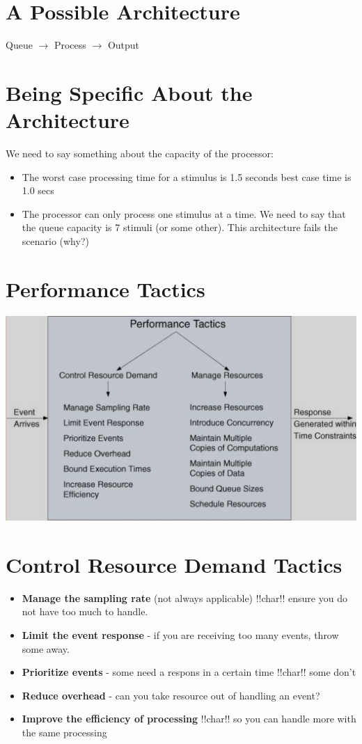 \documentclass[a4paper]{report}
\begin{document}
\section{A Possible Architecture}

Queue $\rightarrow$ Process $\rightarrow$ Output

\section{Being Specific About the Architecture}

We need to say something about the capacity of the processor:
\begin{itemize}
\item{The worst case processing time for a stimulus is 1.5 seconds best case time is 1.0 secs}
\item{The processor can only process one stimulus at a time.}
We need to say that the queue capacity is 7 stimuli (or some other).
This architecture fails the scenario (why?)
\end{itemize}

\section{Performance Tactics}
\includegraphics[scale=0.6]{zxc.png}

\section{Control Resource Demand Tactics}

\begin{itemize}
\item{\textbf{Manage the sampling rate} (not always applicable) !!char!! ensure you do not have too much to handle.}
\item{\textbf{Limit the event response} - if you are receiving too many events, throw some away.}
\item{\textbf{Prioritize events} - some need a respons in a certain time !!char!! some don't}
\item{\textbf{Reduce overhead} - can you take resource out of handling an event?}
\item{\textbf{Improve the efficiency of processing} !!char!! so you can handle more with the same processing}
\end{itemize}
\end{document}
